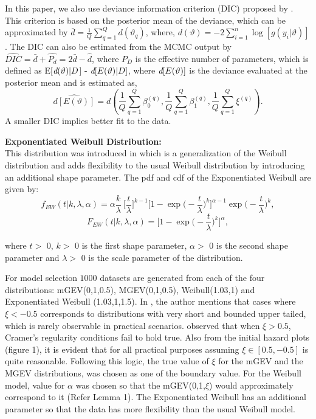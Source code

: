 \documentclass[smallextended]{svjour3}       %
\begin{document}
{In this paper, we also use deviance information criterion (DIC) proposed by \citet{spiegelhalter:2002}. This criterion is based on the posterior mean of the deviance, which can be approximated by $\bar{d} = \frac{1}{Q}\displaystyle\sum\limits_{q=1}^Q d(\vartheta_q)$, where, $d(\vartheta) = -2 \displaystyle\sum\limits_{i=1}^n \log[g(y_i|\vartheta)]$. The DIC can also be estimated from the MCMC output by $\widehat{DIC} = \bar{d} + \hat{P_d} = 2\bar{d}-\hat{d}$, where $P_D$ is the effective number of parameters, which is defined as E[$\textit d(\vartheta)|D$] - $\textit d[E(\vartheta)|D]$, where $\textit d[E(\vartheta)]$ is the deviance evaluated at the posterior mean and is estimated as,
$$ \widehat {d[E(\vartheta)]} = d \left(\frac{1}{Q}\displaystyle\sum\limits_{q=1}^Q \beta_0^{(q)},\frac{1}{Q}\displaystyle\sum\limits_{q=1}^Q \beta_1^{(q)},\frac{1}{Q}\displaystyle\sum\limits_{q=1}^Q \xi^{(q)}\right).$$
A smaller DIC implies better fit to the data.


\textbf{Exponentiated Weibull Distribution:}\\
This distribution was introduced in \citet{mudholkar:srivastava:1993} which is a generalization of the Weibull distribution and adds flexibility to the usual Weibull distribution by introducing an additional shape parameter. The pdf and cdf of the Exponentiated Weibull are given by:
\[
f_{EW}(t|k,\lambda,\alpha)=\alpha\frac{k}{\lambda}\ \bigg[ \frac{t}{\lambda}\bigg]^{k-1}\bigg[1-\exp{\Big(-\frac{t}{\lambda}\Big)^{k}}\bigg]^{\alpha-1}\exp{\Big(-\frac{t}{\lambda}\Big)^{k}},
\]
\[
F_{EW}(t|k,\lambda,\alpha)=\bigg[1-\exp{\Big(-\frac{t}{\lambda}\Big)^{k}}\bigg]^{\alpha},
\]

where $t>$ 0, $k>$ 0 is the first shape parameter, $\alpha>$ 0 is the second shape parameter and $\lambda>$ 0 is the scale parameter of the distribution.

For model selection $1000$ datasets are generated from each of the four distributions: mGEV(0,1,0.5), MGEV(0,1,0.5), Weibull(1.03,1) and Exponentiated Weibull (1.03,1,1.5). In \citet{smith:1985}, the author mentions that cases where $\xi < -0.5$ corresponds to distributions with very short and bounded upper tailed, which is rarely observable in practical scenarios. \citet{castillo:1997} observed that when $\xi > 0.5$, Cramer's regularity conditions fail to hold true. Also from the initial hazard plots (figure 1), it is evident that for all practical purposes assuming $\xi \in [0.5, -0.5]$ is quite reasonable. Following this logic, the true value of $\xi$ for the mGEV and the MGEV distributions, was chosen as one of the boundary value. For the Weibull model, value for $\alpha$ was chosen so that the mGEV(0,1,$\xi$) would approximately correspond to it (Refer Lemma 1). The Exponentiated Weibull has an additional parameter so that the data has more flexibility than the usual Weibull model. 


}
\end{document}
